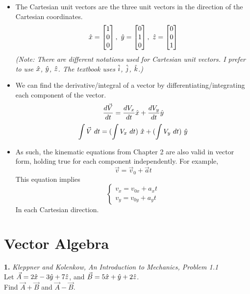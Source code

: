 \documentclass[11pt]{article}
\theoremstyle{gangnamstyle}{\newtheorem{definition}{Definition}[]}
\theoremstyle{gangnamstyle}{\newtheorem{example}{Example}[]}
\theoremstyle{gangnamstyle}{\newtheorem{problem}{Problem}[]}
\begin{document}
\begin{itemize}
\item The Cartesian unit vectors are the three unit vectors in the direction of the Cartesian coordinates. 
\[ \Hat{x} = \begin{bmatrix}
1 \\
0 \\
0
\end{bmatrix}, 
\ \Hat{y} = \begin{bmatrix}
0 \\
1 \\
0
\end{bmatrix}, 
\ \Hat{z} = \begin{bmatrix}
0 \\
0 \\
1
\end{bmatrix}\]
\textit{(Note: There are different notations used for Cartesian unit vectors. I prefer to use $\Hat{x}$, $\Hat{y}$, $\Hat{z}$. The textbook uses $\Hat{i}$, $\Hat{j}$, $\Hat{k}$.)}

\item We can find the derivative/integral of a vector by differentiating/integrating each component of the vector. 
\[ \frac{d\Vec{V}}{dt} = \frac{dV_x}{dt} \Hat{x} + \frac{dV_y}{dt} \Hat{y} \]
\[ \int \Vec{V} \ dt = (\int V_x \ dt) \ \Hat{x} + (\int V_y \ dt) \ \Hat{y} \]

\item As such, the kinematic equations from Chapter 2 are also valid in vector form, holding true for each component independently. For example, 
\[ \Vec{v} = \Vec{v}_0 + \Vec{a}t \]
This equation implies 
\[ \begin{cases}
v_x = v_{0x} + a_xt \\
v_y = v_{0y} + a_yt
\end{cases} \]
In each Cartesian direction. 
\end{itemize}

\pagebreak

\section{Vector Algebra}

\textbf{1.} \textit{Kleppner and Kolenkow, An Introduction to Mechanics, Problem 1.1} \\
Let $\Vec{A} = 2\Hat{x} - 3\Hat{y} + 7\Hat{z}$, and $\Vec{B} = 5\Hat{x} + \Hat{y} + 2\Hat{z}$. \\
Find $\Vec{A} + \Vec{B}$ and $\Vec{A} - \Vec{B}$. 
\vspace{1 in}
\end{document}
